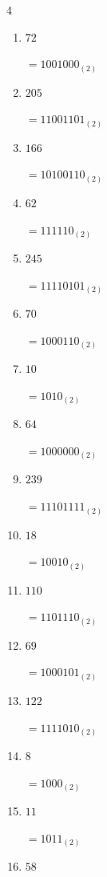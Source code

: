 \begin{multicols}{4}
\begin{enumerate}
        $=1010111_{(2)}$

  \item $72$

        $=1001000_{(2)}$

  \item $205$

        $=11001101_{(2)}$

  \item $166$

        $=10100110_{(2)}$

  \item $62$

        $=111110_{(2)}$

  \item $245$

        $=11110101_{(2)}$

  \item $70$

        $=1000110_{(2)}$

  \item $10$

        $=1010_{(2)}$

  \item $64$

        $=1000000_{(2)}$

  \item $239$

        $=11101111_{(2)}$

  \item $18$

        $=10010_{(2)}$

  \item $110$

        $=1101110_{(2)}$

  \item $69$

        $=1000101_{(2)}$

  \item $122$

        $=1111010_{(2)}$

\columnbreak %

\resetques

  \item $8$

        $=1000_{(2)}$

  \item $11$

        $=1011_{(2)}$

  \item $58$


\end{enumerate}
\end{multicols}
